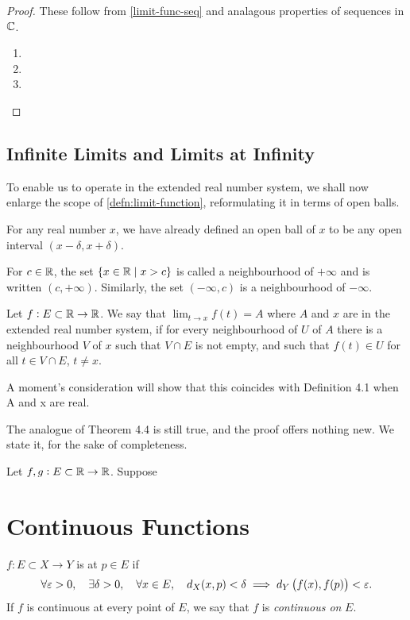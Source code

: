 \begin{proof}
These follow from \cref{limit-func-seq} and analagous properties of sequences in $\mathbb C$.
\begin{enumerate}[label=(\roman*)]
\item 
\item 
\item 
\end{enumerate}
\end{proof}

\subsection{Infinite Limits and Limits at Infinity}
To enable us to operate in the extended real number system, we shall now enlarge the scope of \cref{defn:limit-function}, reformulating it in terms of open balls.

For any real number $x$, we have already defined an open ball of $x$ to be any open interval $(x-\delta,x+\delta)$.

\begin{definition}
For $c\in\mathbb R$, the set $\{x\in\mathbb R\mid x>c\}$ is called a neighbourhood of $+\infty$ and is written $(c,+\infty)$. Similarly, the set $(-\infty,c)$ is a neighbourhood of $-\infty$.
\end{definition}

\begin{definition}
Let $f:E\subset\mathbb R\to\mathbb R$. We say that $\displaystyle\lim_{t\to x}f(t)=A$ where $A$ and $x$ are in the extended real number system, if for every neighbourhood of $U$ of $A$ there is a neighbourhood $V$ of $x$ such that $V\cap E$ is not empty, and such that $f(t)\in U$ for all $t\in V\cap E$, $t\neq x$.
\end{definition}
A moment's consideration will show that this coincides with Definition
4.1 when A and x are real.

The analogue of Theorem 4.4 is still true, and the proof offers nothing new. We state it, for the sake of completeness. 

\begin{lemma}
Let $f,g:E\subset\mathbb R\to\mathbb R$. Suppose 
\end{lemma}
\pagebreak

\section{Continuous Functions}
\begin{definition}[Continuity]\label{defn:continuity}
$f:E\subset X\to Y$ is  at $p\in E$ if 
\[\forall\varepsilon>0,\quad\exists\delta>0,\quad\forall x\in E,\quad d_X(x,p)<\delta\implies d_Y\left(f(x),f(p)\right)<\varepsilon.\]
If $f$ is continuous at every point of $E$, we say that $f$ is \emph{continuous on} $E$.
\end{definition}

